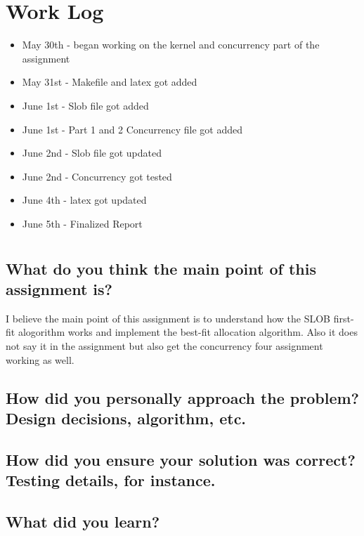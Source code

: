\documentclass[draftclsnofoot,onecolumn,10pt,compsoc]{IEEEtran}
\begin{document}
\section{Work Log}
\begin{itemize}
	\item May 30th - began working on the kernel and concurrency part of the assignment
	\item May 31st - Makefile and latex got added
	\item June 1st - Slob file got added
	\item June 1st - Part 1 and 2 Concurrency file got added
	\item June 2nd - Slob file got updated
	\item June 2nd - Concurrency got tested
	\item June 4th - latex got updated
	\item June 5th - Finalized Report
	
	
	
	
	
\end{itemize}
\section{}
\subsection{What do you think the main point of this assignment is?}
 I believe the main point of this assignment is to understand how the SLOB first-fit alogorithm works and implement the best-fit allocation algorithm.  Also it does not say it in the assignment but also get the concurrency four assignment working as well.  
\subsection{How did you personally approach the problem? Design decisions, algorithm, etc.}

\subsection{How did you ensure your solution was correct? Testing details, for instance.}

\subsection{What did you learn?}
\end{document}
